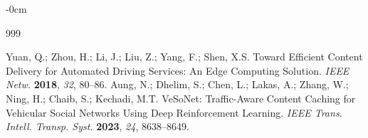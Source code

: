 \documentclass[sensors,article,accept,moreauthors,pdftex]{Definitions/mdpi}
\begin{document}
\begin{adjustwidth}{-\extralength}{0cm}
{}


\begin{thebibliography}{999}

Yuan, Q.; Zhou, H.; Li, J.; Liu, Z.; Yang, F.; Shen, X.S.  Toward Efficient Content Delivery for Automated Driving Services: An Edge Computing Solution. \emph{IEEE Netw.} \textbf{2018},  \emph{32},  80--86.
Aung, N.; {Dhelim, S.; Chen, L.; Lakas, A.; Zhang, W.; Ning, H.; Chaib, S.; Kechadi, M.T.} %
 VeSoNet: Traffic-Aware Content Caching for Vehicular Social Networks Using Deep Reinforcement Learning. \emph{IEEE Trans. Intell. Transp. Syst.} {\textbf{2023}, \emph{24}, 8638--8649.} %


\end{thebibliography}
\end{adjustwidth}
\end{document}
